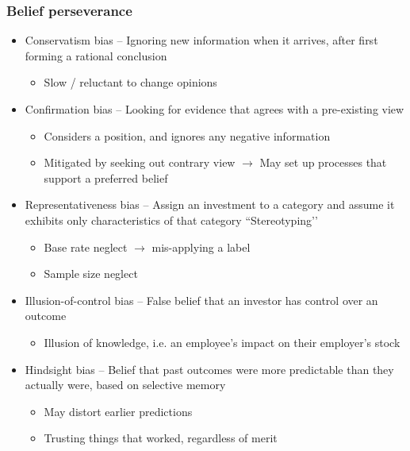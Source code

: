 \documentclass[../notes_compiled.tex]{subfiles}
\begin{document}
\begin{itemize}
\subsubsection*{Belief perseverance}
\begin{itemize}
\item Conservatism bias -- Ignoring new information when it arrives, after first forming a rational conclusion
\begin{itemize}
\item Slow / reluctant to change opinions
\end{itemize}
\item Confirmation bias -- Looking for evidence that agrees with a pre-existing view
\begin{itemize}
\item Considers a position, and ignores any negative information
\item Mitigated by seeking out contrary view $\rightarrow$ May set up processes that support a preferred belief 
\end{itemize}
\item Representativeness bias -- Assign an investment to a category and assume it exhibits only characteristics of that category ``Stereotyping’’
\begin{itemize}
\item Base rate neglect $\rightarrow$ mis-applying a label
\item Sample size neglect
\end{itemize}
\item Illusion-of-control bias -- False belief that an investor has control over an outcome
\begin{itemize}
\item Illusion of knowledge, i.e. an employee’s impact on their employer’s stock
\end{itemize}
\item Hindsight bias -- Belief that past outcomes were more predictable than they actually were, based on selective memory
\begin{itemize}
\item May distort earlier predictions
\item Trusting things that worked, regardless of merit
\end{itemize}
\end{itemize}


\end{itemize}
\end{document}
